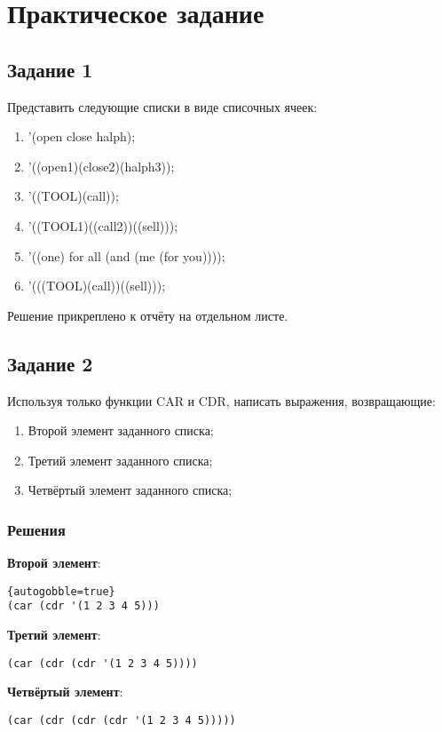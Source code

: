 \chapter*{Практическое задание}

\section*{Задание 1}
Представить следующие списки в виде списочных ячеек:
\begin{enumerate}
	\item '(open close halph);
	\item '((open1)(close2)(halph3));
	\item '((TOOL)(call));
	\item '((TOOL1)((call2))((sell)));
	\item '((one) for all (and (me (for you))));
	\item '(((TOOL)(call))((sell)));
\end{enumerate}

Решение прикреплено к отчёту на отдельном листе.

\section*{Задание 2}
Используя только функции CAR и CDR, написать выражения, возвращающие:
\begin{enumerate}
	\item Второй элемент заданного списка;
	\item Третий элемент заданного списка;
	\item Четвёртый элемент заданного списка;
\end{enumerate}

\subsection*{Решения}
\textbf{Второй элемент}:
\begin{lstlisting}{autogobble=true}
(car (cdr '(1 2 3 4 5)))
\end{lstlisting}

\textbf{Третий элемент}:
\begin{lstlisting}
(car (cdr (cdr '(1 2 3 4 5))))
\end{lstlisting}
	
\textbf{Четвёртый элемент}:
\begin{lstlisting}
(car (cdr (cdr (cdr '(1 2 3 4 5)))))
\end{lstlisting}

